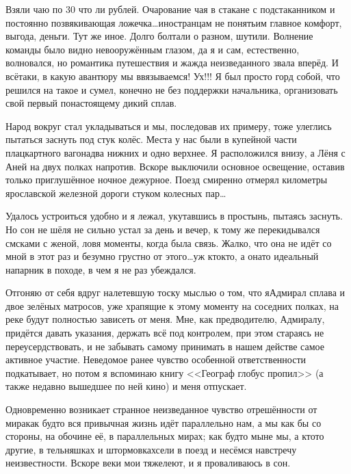 Взяли чаю по 30 что ли рублей. Очарование чая в стакане с подстаканником и постоянно позвякивающая ложечка\ldots иностранцам не понять\mdash им главное комфорт, выгода, деньги. Тут же иное. Долго болтали о разном, шутили. Волнение команды было видно невооружённым глазом, да я и сам, естественно, волновался, но романтика путешествия и жажда неизведанного звала вперёд. И всё\sdash таки, в какую авантюру мы ввязываемся! Ух!!! Я был просто горд собой, что решился на такое и сумел, конечно не без поддержки начальника, организовать свой первый по\sdash настоящему дикий сплав. 

Народ вокруг стал укладываться и мы, последовав их примеру, тоже улеглись пытаться заснуть под стук колёс. Места у нас были в купейной части плацкартного вагона\mdash два нижних и одно верхнее. Я расположился внизу, а Лёня с Аней на двух полках напротив. Вскоре выключили основное освещение, оставив только приглушённое ночное дежурное. Поезд смиренно отмерял километры ярославской железной дороги стуком колесных пар\ldots

Удалось устроиться удобно и я лежал, укутавшись в простынь, пытаясь заснуть. Но сон не шёл\mdash я не сильно устал за день и вечер, к тому же перекидывался смс\sdash ками с женой, ловя моменты, когда была связь. Жалко, что она не идёт со мной в этот раз и безумно грустно от этого\ldots уж кто\sdash кто, а она\sdash то идеальный напарник в походе, в чем я не раз убеждался.
 
Отгоняю от себя вдруг налетевшую тоску мыслью о том, что я\mdash Адмирал сплава и двое зелёных матросов, уже храпящие к этому моменту на соседних полках, на реке будут полностью зависеть от меня. Мне, как предводителю, Адмиралу, придётся давать указания, держать всё под контролем, при этом стараясь не переусердствовать, и не забывать самому принимать в нашем действе самое активное участие. Неведомое ранее чувство особенной ответственности подкатывает, но потом я вспоминаю книгу <<Географ глобус пропил>> \cite{ГеографГлобусПропил} (а также недавно вышедшее по ней кино) и меня отпускает. 

Одновременно возникает странное неизведанное чувство отрешённости от мира\mdash как будто вся привычная жизнь идёт параллельно нам, а мы как бы со стороны, на обочине её, в параллельных мирах; как будто мы\mdash не мы, а кто\sdash то другие, в тельняшках и штормовках\mdash сели в поезд и несёмся навстречу неизвестности. Вскоре веки мои тяжелеют, и я проваливаюсь в сон.

\begin{center}
\end{center}